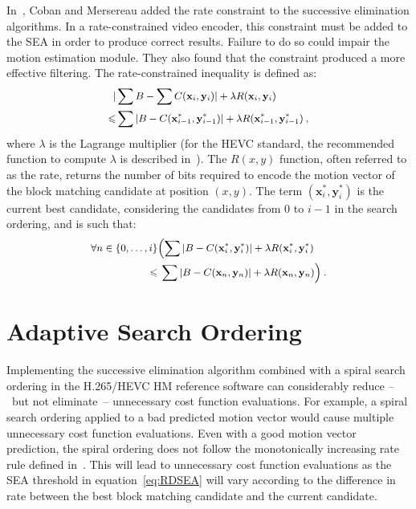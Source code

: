 \documentclass{article}
\newcommand{\beq}{\begin{dmath}}
\newcommand{\eeq}{\end{dmath}}
\newcommand{\vx}{\mathbf{x}}
\newcommand{\vy}{\mathbf{y}}
\begin{document}
In~\cite{Coban1998}, Coban and Mersereau added the rate constraint to the successive elimination algorithms. In a rate-constrained video encoder, this constraint must be added to the SEA in order to produce correct results. Failure to do so could impair the motion estimation module. They also found that the constraint produced a more effective filtering. The rate-constrained inequality is defined as:
\beq
\small
\begin{aligned}
| & \sum{B} - \sum{C(\vx_i,\vy_i)} | + \lambda R(\vx_i,\vy_i) \\ \leqslant
& \sum{|B - C(\vx^*_{i-1},\vy^*_{i-1})|} + \lambda R(\vx^*_{i-1},\vy^*_{i-1}) \:,
\end{aligned}
\label{eq:RDSEA}
\eeq
where $\lambda$ is the Lagrange multiplier (for the HEVC standard, the recommended function to compute $\lambda$ is described in~\cite{McCann2014}). The $R(x,y)$ function, often referred to as the rate, returns the number of bits required to encode the motion vector of the block matching candidate at position $(x,y)$. The term $(\vx^*_{i}, \vy^*_{i})$ is the current best candidate, considering the candidates from 0 to $i-1$ in the search ordering, and is such that:
\beq
\small
\begin{aligned}
\forall n \in \{0,\ldots,i\} & \Bigl( \sum{|B - C(\vx^*_{i},\vy^*_{i})|} + \lambda
R(\vx^*_{i},\vy^*_{i}) \\ 
\leqslant & \: \sum{|B - C(\vx_{n},\vy_{n})|} + \lambda
R(\vx_{n},\vy_{n})\Bigr)\:.
\end{aligned}
\eeq


\section{Adaptive Search Ordering}
\label{sec:searchOrder}
Implementing the successive elimination algorithm combined with a spiral search ordering in the H.265/HEVC HM reference software can considerably reduce --~but not eliminate~-- unnecessary cost function evaluations. For example, a spiral search ordering applied to a bad predicted motion vector would cause multiple unnecessary cost function evaluations. Even with a good motion vector prediction, the spiral ordering does not follow the monotonically increasing rate rule defined in~\cite{Trud14}. This will lead to unnecessary cost function evaluations as the SEA threshold in equation~\ref{eq:RDSEA} will vary according to the difference in rate between the best block matching candidate and the current candidate.
\end{document}
